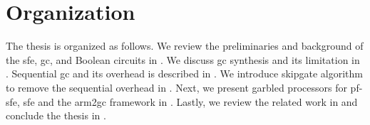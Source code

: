 \section{Organization}
The thesis is organized as follows.
We review the preliminaries and background of the \acrshort{sfe}, \acrshort{gc}, and Boolean circuits in .
We discuss \acrshort{gc} synthesis and its limitation in .
Sequential \acrshort{gc} and its overhead is described in .
We introduce \gls{skipgate} algorithm to remove the sequential overhead in .
Next, we present garbled processors for \acrshort{pf-sfe}, \acrshort{sfe} and the \gls{arm2gc} framework in .
Lastly, we review the related work in  and conclude the thesis in .
